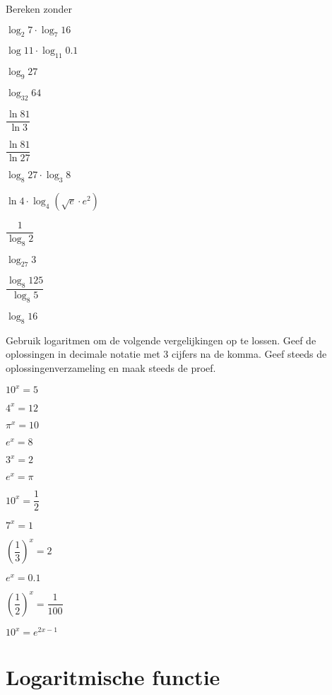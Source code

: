 \documentclass[12pt,twoside]{article}
\begin{document}
\begin{oefening} %
Bereken zonder 
\begin{exlist}{2}
  \item $\log_2 7 \cdot \log_7 16$
  \item $\log 11 \cdot \log_{11} 0.1$
  \item $\log_9 27$
  \item $\log_{32} 64$
  \item $\dfrac{\ln 81}{\ln 3}$
  \item $\dfrac{\ln 81}{\ln 27}$
  \item $\log_8 27 \cdot \log_3 8$
  \item $\ln 4 \cdot \log_4 (\sqrt{e}\cdot e^2)$
  \item $\dfrac{1}{\log_8 2}$
  \item $\log_27 3$
  \item $\dfrac{\log_8 125}{\log_8 5}$
  \item $\log_8 16$
\end{exlist}
\end{oefening}

\begin{oefening} %
Gebruik logaritmen om de volgende vergelijkingen op te lossen. Geef de oplossingen in decimale notatie met 3 cijfers na de komma. Geef steeds de oplossingenverzameling en maak steeds de proef.
\begin{exlist}{2}
  \item $10^x=5$
  \item $4^x=12$
  \item $\pi^x=10$
  \item $e^x=8$
  \item $3^x=2$
  \item $e^x=\pi$
  \item $10^x=\dfrac{1}{2}$
  \item $7^x=1$
  \item $\left(\dfrac{1}{3}\right)^x=2$
  \item $e^x=0.1$
  \item $\left(\dfrac{1}{2}\right)^x=\dfrac{1}{100}$
  \item $10^x=e^{2x-1}$
\end{exlist}
\end{oefening}


\pagebreak
\section{Logaritmische functie}
\end{document}
